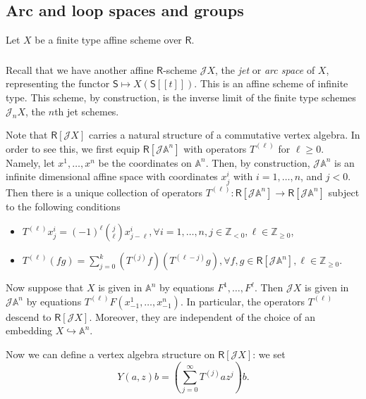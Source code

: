 \documentclass{amsart}
\theoremstyle{definition}
\newcommand{\sss}{\subsubsection{}}
\newcommand{\Ring}{\mathsf{R}}
\newcommand{\Z}{\mathbb{Z}}
\newcommand{\Jet}{\mathscr{J}}
\numberwithin{equation}{section}
\begin{document}
\subsection{Arc and loop spaces and groups}\label{SS_arcs_loops}
Let $X$ be a finite type affine scheme over $\Ring$. %
\sss
Recall that we have another affine $\Ring$-scheme $\Jet X$, the {\it jet} or {\it arc space} of $X$, representing the functor $\mathsf{S}\mapsto X(\mathsf{S}[[t]])$. This is an affine scheme of infinite type. This scheme, by construction, is the inverse limit of the finite type schemes $\Jet_nX$, the $n$th jet schemes. 

Note that $\Ring[\Jet X]$ carries a natural structure of a commutative vertex algebra. In order to see this, we first equip $\Ring[\Jet \mathbb{A}^n]$ with operators $T^{(\ell)}$ for $\ell\geqslant 0$. Namely, let $x^1,\ldots,x^n$ be the coordinates on $\mathbb{A}^n$. Then, by construction, $\Jet\mathbb{A}^n$ is an infinite dimensional affine space with coordinates $x^i_j$ with $i=1,\ldots,n$, and $j< 0$. Then there is a unique collection of operators $T^{(\ell)}: \Ring[\Jet\mathbb{A}^n]\rightarrow \Ring[\Jet\mathbb{A}^n]$ subject to the following conditions
\begin{itemize}
\item $T^{(\ell)}x^i_j=(-1)^\ell {j\choose \ell}x^i_{j-\ell}, \forall i=1,\ldots,n,j\in \Z_{<0},\ell\in \Z_{\geqslant 0}$,
\item $T^{(\ell)}(fg)=\sum_{j=0}^k (T^{(j)}f)(T^{(\ell-j)}g), \forall f,g\in \Ring[\Jet \mathbb{A}^n],\ell\in \Z_{\geqslant 0}$.
\end{itemize}

Now suppose that $X$ is given in $\mathbb{A}^n$ by equations $F^1,\ldots,F^\ell$. Then $\Jet X$ is given in $\Jet\mathbb{A}^n$ by equations $T^{(\ell)}F(x^1_{-1},\ldots,x^n_{-1})$. In particular, the operators $T^{(\ell)}$ descend to 
$\Ring[\Jet X]$. Moreover, they are independent of the choice of an embedding $X\hookrightarrow  \mathbb{A}^n$. 

Now we can define a vertex algebra structure on $\Ring[\Jet X]$: we set $$Y(a,z)b=(\sum_{j=0}^\infty T^{(j)}az^j)b.$$
\end{document}
